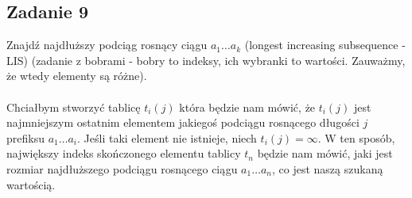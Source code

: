 \documentclass[a4paper]{article}
\begin{document}
\subsection*{Zadanie 9}
Znajdź najdłuższy podciąg rosnący ciągu $a_1 \dots a_k$ (longest increasing subsequence - LIS) (zadanie z bobrami - bobry to indeksy, ich wybranki to wartości. Zauważmy, że wtedy elementy są różne).\\ \\
Chciałbym stworzyć tablicę $t_i(j)$ która będzie nam mówić, że $t_i(j)$ jest najmniejszym ostatnim elementem jakiegoś podciągu rosnącego długości $j$ prefiksu $a_1\dots a_i$. Jeśli taki element nie istnieje, niech $t_i(j)=\infty$. W ten sposób, największy indeks skończonego elementu tablicy $t_n$ będzie nam mówić, jaki jest rozmiar najdłuższego podciągu rosnącego ciągu $a_1 \dots a_n$, co jest naszą szukaną wartością.
\end{document}
